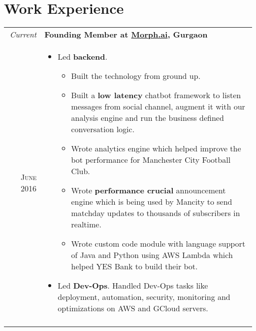 \documentclass[a4paper,10pt]{article}
\begin{document}
\section{Work Experience}
\begin{tabular}{r|p{16cm}}
 \emph{Current} & \textbf{Founding Member at \href{http://www.morph.ai}{Morph.ai}, Gurgaon} \\\textsc{June 2016}&
 \begin{itemize}[noitemsep]
 \item Led \textbf{backend}.
 \begin{itemize}[noitemsep]
 \item Built the technology from ground up.
 \item Built a \textbf{low latency} chatbot framework to listen messages from social channel, augment it with our analysis engine and run the business defined conversation logic.
 \item Wrote analytics engine which helped improve the bot performance for Manchester City Football Club.
 \item Wrote \textbf{performance crucial} announcement engine which is being used by Mancity to send matchday updates to thousands of subscribers in realtime.
 \item Wrote custom code module with language support of Java and Python using AWS Lambda which helped YES Bank to build their bot.
 \end{itemize}

 \item Led \textbf{Dev-Ops}.
 Handled Dev-Ops tasks like deployment, automation, security, monitoring and optimizations on AWS and GCloud servers.\end{itemize}\\\multicolumn{2}{c}{} \\


\end{tabular}
\end{document}
